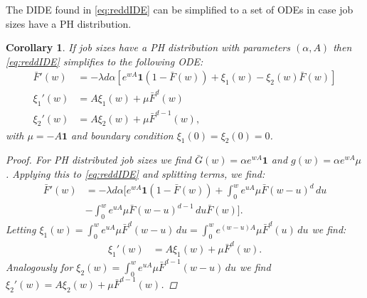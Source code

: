 \documentclass[12pt]{report}
\newtheorem{corollary}[theorem]{Corollary}
\begin{document}
The DIDE found in \eqref{eq:reddIDE} can be simplified to a set of ODEs in case job sizes have a PH distribution.
\begin{corollary}\label{cor:id_PH}
If job sizes have a PH distribution with parameters $(\alpha, A)$ then \eqref{eq:reddIDE} simplifies to the following ODE:
\begin{align*}
\bar{F}'(w) &= -\lambda d \alpha \left[ e^{wA}\textbf{1} (1-\bar F(w)) + \xi_1(w) - \xi_2(w) \bar F(w) \right]\\
\xi_1'(w) &= A\xi_1(w) + \mu \bar F^d(w)\\
\xi_2'(w) &= A\xi_2(w) + \mu \bar F^{d-1}(w),
\end{align*}
with $\mu = -A\textbf{1}$ and boundary condition $\xi_1(0)=\xi_2(0)=0$.
\begin{proof}
For PH distributed job sizes we find $\bar G(w)= \alpha e^{wA} \textbf{1}$ and $g(w) = \alpha e^{wA} \mu$. Applying this to \eqref{eq:reddIDE} and splitting terms, we find:
\begin{align}
\bar F'(w) &= -\lambda d \alpha \bigg[ e^{wA}\textbf{1} (1-\bar F(w)) + \int_0^w e^{uA} \mu \bar F (w-u) ^d \, du \nonumber\\
& - \int_0^w e^{uA} \mu \bar F(w-u)^{d-1}\, du \bar F(w)
\bigg]. \label{eq:PH_proof1}
\end{align}
Letting $\xi_1(w)=\int_0^w e^{uA} \mu \bar F^d(w-u)\, du=\int_0^w e^{(w-u)A} \mu \bar F^d(u)\, du$ we find:
\begin{align*}
\xi_1'(w)&=A\xi_1(w)+\mu \bar F^d(w).
\end{align*}
Analogously for $\xi_2(w)=\int_0^w e^{uA} \mu \bar F^{d-1}(w-u)\, du$ we find $\xi_2'(w)=A\xi_2(w)+\mu \bar F^{d-1}(w)$.
\end{proof}
\end{corollary}
\end{document}
